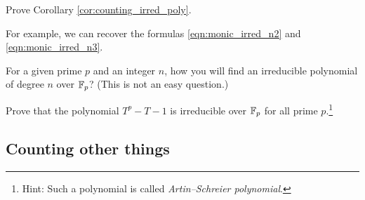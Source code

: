 \begin{exercise}
    Prove Corollary \ref{cor:counting_irred_poly}.
\end{exercise}

For example, we can recover the formulas \ref{eqn:monic_irred_n2} and \ref{eqn:monic_irred_n3}.

\begin{exercise}
    For a given prime $p$ and an integer $n$, how you will find an irreducible polynomial of degree $n$ over $\mathbb{F}_p$? (This is not an easy question.)
\end{exercise}

\begin{exercise}
    Prove that the polynomial $T^p - T - 1$ is irreducible over $\mathbb{F}_p$ for all prime $p$.\footnote{Hint: Such a polynomial is called \emph{Artin--Schreier polynomial}.}
\end{exercise}


\subsection{Counting other things}

\newpage
